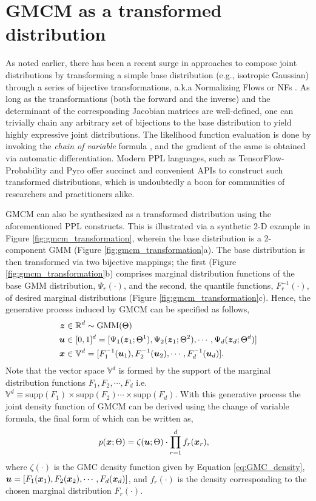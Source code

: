 \documentclass{article}
\theoremstyle{plain}
\theoremstyle{definition}
\theoremstyle{remark}
\begin{document}
\section{GMCM as a transformed distribution} \label{sec:GMCM_bijective}
As noted earlier, there has been a recent surge in approaches to compose joint distributions by transforming a simple base distribution (e.g., isotropic Gaussian) through a series of bijective transformations, a.k.a Normalizing Flows or NFs \citet{Kobyzev2021}. As long as the transformations (both the forward and the inverse) and the determinant of the corresponding Jacobian matrices are well-defined, one can trivially chain any arbitrary set of bijections to the base distribution to yield highly expressive joint distributions. The likelihood function evaluation is done by invoking the \emph{chain of variable} formula \citep[Chapter~V.5]{mood1973}, and the gradient of the same is obtained via automatic differentiation. Modern PPL languages, such as TensorFlow-Probability \citep{TFP2017} and Pyro \citep{bingham2019pyro} offer succinct and convenient APIs to construct such transformed distributions, which is undoubtedly a boon for communities of researchers and practitioners alike.

GMCM can also be synthesized as a transformed distribution using the aforementioned PPL constructs. This is illustrated via a synthetic 2-D example in Figure \ref{fig:gmcm_transformation}, wherein the base distribution is a 2-component GMM (Figure \ref{fig:gmcm_transformation}a). The base distribution is then transformed via two bijective mappings; the first (Figure \ref{fig:gmcm_transformation}b) comprises marginal distribution functions of the base GMM distribution, $\Psi_r(\cdot)$, and the second, the quantile functions, $F^{-1}_r(\cdot)$, of desired marginal distributions (Figure \ref{fig:gmcm_transformation}c). Hence, the generative process induced by GMCM can be specified as follows,
\begin{align*}
\boldsymbol{z}& \in \mathbb{R}^d  \sim \text{GMM}(\Theta) \\
\boldsymbol{u}& \in [0,1]^d = [\Psi_1(\boldsymbol{z}_1;\Theta^1), \Psi_2(\boldsymbol{z}_1;\Theta^2), \cdots, \Psi_d(\boldsymbol{z}_d;\Theta^d)] \\
\boldsymbol{x}& \in \mathbb{V}^d = [F^{-1}_1(\boldsymbol{u}_1), F^{-1}_2(\boldsymbol{u}_2), \cdots, F^{-1}_d(\boldsymbol{u}_d)].
\end{align*}
Note that the vector space $\mathbb{V}^d$ is formed by the support of the marginal distribution functions $F_1, F_2,\cdots, F_d$ i.e. $\mathbb{V}^d \equiv \text{supp}(F_1)\times \text{supp}(F_2)\cdots\times \text{supp}(F_d)$. With this generative process the joint density function of GMCM can be derived using the change of variable formula, the final form of which can be written as,
\begin{align}\label{eq:GMCM_density}
p(\boldsymbol{x};\Theta)&= \zeta(\boldsymbol{u};\Theta) \cdot \prod\limits_{r=1}^{d}f_r(\boldsymbol{x}_r),
\end{align}
where $\zeta(\cdot)$ is the GMC density function given by Equation \eqref{eq:GMC_density}, $\boldsymbol{u} = [F_1(\boldsymbol{x}_1), F_2(\boldsymbol{x}_2), \cdots, F_d(\boldsymbol{x}_d) ]$, and $f_r(\cdot)$ is the density corresponding to the chosen marginal distribution $F_r(\cdot)$.
\end{document}
